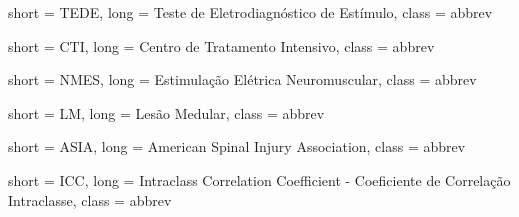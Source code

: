  {
	short = TEDE,
	long = Teste de Eletrodiagnóstico de Estímulo,
	class = abbrev
}

 {
	short = CTI,
	long = Centro de Tratamento Intensivo,
	class = abbrev
}

 {
	short = NMES,
	long =  Estimulação Elétrica Neuromuscular,
	class = abbrev
}

 {
	short = LM,
	long =  Lesão Medular,
	class = abbrev
}

 {
	short = ASIA,
	long =  American Spinal Injury Association,
	class = abbrev
}

 {
	short = ICC,
	long =  Intraclass Correlation Coefficient - Coeficiente de Correlação Intraclasse,
	class = abbrev
}